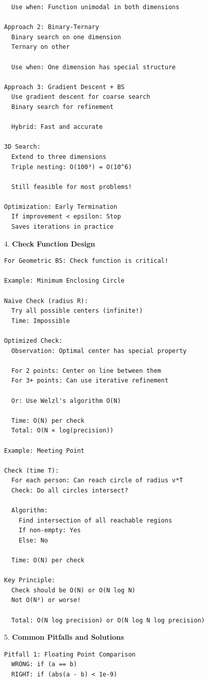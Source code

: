 \documentclass[11pt,a4paper,oneside]{book}
\begin{document}
\begin{tcolorbox}[
    enhanced,breakable,
    colback=white,
    colframe=deepblue,
    boxrule=1.5pt,
    arc=3mm,
    title=\textbf{Spatial Monotonicity and Continuous Optimization}
]
\begin{verbatim}
  Use when: Function unimodal in both dimensions

Approach 2: Binary-Ternary
  Binary search on one dimension
  Ternary on other
  
  Use when: One dimension has special structure

Approach 3: Gradient Descent + BS
  Use gradient descent for coarse search
  Binary search for refinement
  
  Hybrid: Fast and accurate

3D Search:
  Extend to three dimensions
  Triple nesting: O(100³) = O(10^6)
  
  Still feasible for most problems!

Optimization: Early Termination
  If improvement < epsilon: Stop
  Saves iterations in practice
\end{verbatim}

4. \textbf{Check Function Design}
\begin{verbatim}
For Geometric BS: Check function is critical!

Example: Minimum Enclosing Circle

Naive Check (radius R):
  Try all possible centers (infinite!)
  Time: Impossible
  
Optimized Check:
  Observation: Optimal center has special property
  
  For 2 points: Center on line between them
  For 3+ points: Can use iterative refinement
  
  Or: Use Welzl's algorithm O(N)
  
  Time: O(N) per check
  Total: O(N × log(precision))

Example: Meeting Point

Check (time T):
  For each person: Can reach circle of radius v*T
  Check: Do all circles intersect?
  
  Algorithm:
    Find intersection of all reachable regions
    If non-empty: Yes
    Else: No
  
  Time: O(N) per check

Key Principle:
  Check should be O(N) or O(N log N)
  Not O(N²) or worse!
  
  Total: O(N log precision) or O(N log N log precision)
\end{verbatim}

5. \textbf{Common Pitfalls and Solutions}
\begin{verbatim}
Pitfall 1: Floating Point Comparison
  WRONG: if (a == b)
  RIGHT: if (abs(a - b) < 1e-9)


\end{verbatim}
\end{tcolorbox}
\end{document}
